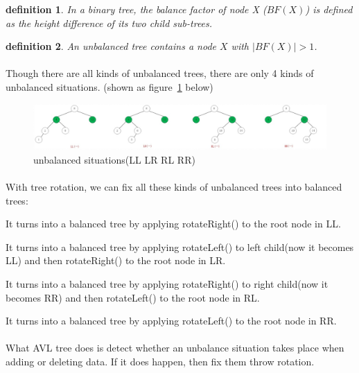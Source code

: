 \documentclass{article}
\newtheorem{definition}{definition}[section]
\begin{document}
\begin{definition}
    In a binary tree, the balance factor of node X ($BF(X)$) is defined as the height difference of its two child sub-trees.
\end{definition}

\begin{definition}
    An unbalanced tree contains a node $X$ with $|BF(X)| > 1$.
\end{definition}

\paragraph{}
Though there are all kinds of unbalanced trees, there are only 4 kinds of unbalanced situations. (shown as figure~\ref{unbalance} below)

\begin{figure}[htbp]
    \centering
	\includegraphics[width = \textwidth]{unbalance.png}
	\caption{unbalanced situations(LL LR RL RR)}
	\label{unbalance}
\end{figure}

\paragraph{}
With tree rotation, we can fix all these kinds of unbalanced trees into balanced trees:

It turns into a balanced tree by applying rotateRight() to the root node in LL.

It turns into a balanced tree by applying rotateLeft() to left child(now it becomes LL) and then rotateRight() to the root node in LR.

It turns into a balanced tree by applying rotateRight() to right child(now it becomes RR) and then rotateLeft() to the root node in RL.

It turns into a balanced tree by applying rotateLeft() to the root node in RR.

\paragraph{}
What AVL tree does is detect whether an unbalance situation takes place when adding or deleting data. If it does happen, then fix them throw rotation.
\end{document}
